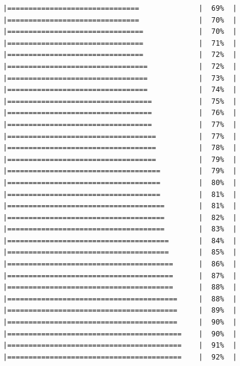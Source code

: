 \documentclass[
  krantz2]{krantz}
\begin{document}
\begin{verbatim}
|===============================              |  69%  |                                                     |===============================              |  70%  |                                                     |================================             |  70%  |                                                     |================================             |  71%  |                                                     |================================             |  72%  |                                                     |=================================            |  72%  |                                                     |=================================            |  73%  |                                                     |=================================            |  74%  |                                                     |==================================           |  75%  |                                                     |==================================           |  76%  |                                                     |==================================           |  77%  |                                                     |===================================          |  77%  |                                                     |===================================          |  78%  |                                                     |===================================          |  79%  |                                                     |====================================         |  79%  |                                                     |====================================         |  80%  |                                                     |====================================         |  81%  |                                                     |=====================================        |  81%  |                                                     |=====================================        |  82%  |                                                     |=====================================        |  83%  |                                                     |======================================       |  84%  |                                                     |======================================       |  85%  |                                                     |=======================================      |  86%  |                                                     |=======================================      |  87%  |                                                     |=======================================      |  88%  |                                                     |========================================     |  88%  |                                                     |========================================     |  89%  |                                                     |========================================     |  90%  |                                                     |=========================================    |  90%  |                                                     |=========================================    |  91%  |                                                     |=========================================    |  92%  |                        
\end{verbatim}
\end{document}
